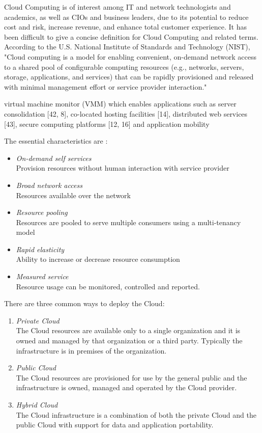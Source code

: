 \documentclass[12pt,a4paper]{report}
\begin{document}
Cloud Computing is of interest among IT and network technologists
and academics, as well as CIOs and business leaders, due to its potential to 
reduce cost and risk, increase revenue, and enhance total customer experience.\cite{weinman2011future}
It has been difficult to give a concise definition for Cloud Computing 
and related terms. According to the U.S. National Institute of Standards 
and Technology (NIST),\cite{mell2009nist}  "Cloud computing is a model for enabling convenient,
on-demand network access to a shared pool of configurable computing resources
(e.g., networks, servers, storage, applications, and services) that can 
be rapidly provisioned and released with minimal management 
effort or service provider interaction." 

virtual machine monitor (VMM) which enables applications such as server consolidation [42, 8], co-located hosting
facilities [14], distributed web services [43], secure computing platforms [12, 16] and application
mobility

The essential characteristics are\cite{mell2009nist} :

\begin{itemize}
  \item \emph{On-demand self services} \\ Provision resources without human
     interaction with service provider
  \item \emph{Broad network access} \\Resources available over the network
  \item \emph{Resource pooling} \\ Resources are pooled to serve multiple 
        consumers using a multi-tenancy model
  \item \emph{Rapid elasticity} \\Ability to increase or decrease resource consumption
  \item \emph{Measured service} \\Resource usage can be monitored, controlled and reported.
\end{itemize}

There are three common ways to deploy the Cloud:

\begin{enumerate}
 \item \emph{Private Cloud} \\The Cloud resources are available only 
to a single organization and it is owned and managed by 
that organization or a third party. Typically the infrastructure is in premises of the 
organization.
 \item \emph{Public Cloud} \\The Cloud resources are provisioned for use by the general 
public and the infrastructure is owned, managed and operated by the Cloud provider.
  \item \emph{Hybrid Cloud} \\The Cloud infrastructure is a combination of 
both the private Cloud and the public Cloud with support for data and application 
portability.
\end{enumerate}
\end{document}
